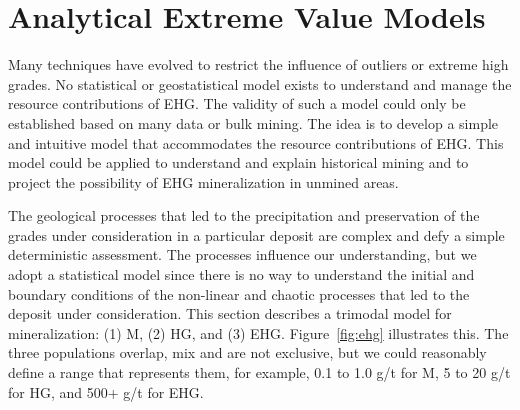 

\FloatBarrier
\section{Analytical Extreme Value Models}
\label{sec:02analytical}

Many techniques have evolved to restrict the influence of outliers or extreme high grades. No statistical or geostatistical model exists to understand and manage the resource contributions of \gls{EHG}. The validity of such a model could only be established based on many data or bulk mining. The idea is to develop a simple and intuitive model that accommodates the resource contributions of \gls{EHG}. This model could be applied to understand and explain historical mining and to project the possibility of \gls{EHG} mineralization in unmined areas.

The geological processes that led to the precipitation and preservation of the grades under consideration in a particular deposit are complex and defy a simple deterministic assessment. The processes influence our understanding, but we adopt a statistical model since there is no way to understand the initial and boundary conditions of the non-linear and chaotic processes that led to the deposit under consideration. This section describes a trimodal model for mineralization: (1) \acrfull{M}, (2) \acrfull{HG}, and (3) \acrfull{EHG}. Figure~\ref{fig:ehg} illustrates this. The three populations overlap, mix and are not exclusive, but we could reasonably define a range that represents them, for example, 0.1 to 1.0 g/t for \gls{M}, 5 to 20 g/t for \gls{HG}, and 500+ g/t for \gls{EHG}.

